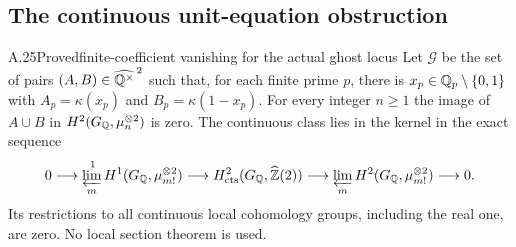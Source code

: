 \subsection{The continuous unit-equation obstruction}

\begin{statement}{A.25}{Proved}{finite-coefficient vanishing for the actual ghost locus}
Let $\mathcal G$ be the set of pairs $(A,B)\in
\widehat{\mathbb Q^\times}^{\,2}$ such that, for each finite prime $p$, there is
$x_p\in\mathbb Q_p\setminus\{0,1\}$ with
$A_p=\kappa(x_p)$ and $B_p=\kappa(1-x_p)$.
For every integer $n\geq1$ the image of $A\cup B$ in
$H^2(G_\mathbb Q,\mu_n^{\otimes2})$ is zero. The continuous class lies in the
kernel in the exact sequence
\[
0\longrightarrow\varprojlim_m^{\,1}
 H^1(G_\mathbb Q,\mu_{m!}^{\otimes2})
 \longrightarrow H^2_{\rm cts}(G_\mathbb Q,\widehat{\mathbb Z}(2))
 \longrightarrow\varprojlim_m H^2(G_\mathbb Q,\mu_{m!}^{\otimes2})
 \longrightarrow0.
\]
Its restrictions to all continuous local cohomology groups, including
the real one, are zero. No local section theorem is used.
\end{statement}
